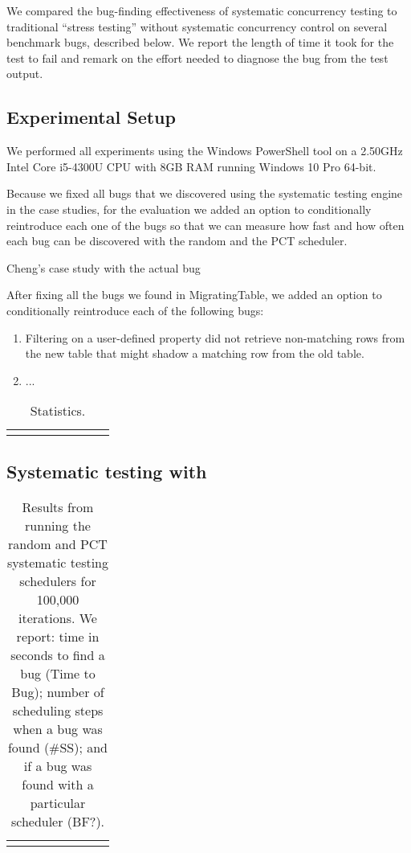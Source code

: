 We compared the bug-finding effectiveness of \psharp systematic concurrency testing to traditional ``stress testing'' without systematic concurrency control on several benchmark bugs, described below.  We report the length of time it took for the test to fail and remark on the effort needed to diagnose the bug from the test output. 

\subsection{Experimental Setup}

We performed all experiments using the Windows PowerShell tool on a 2.50GHz Intel Core i5-4300U CPU with 8GB RAM running Windows 10 Pro 64-bit.

Because we fixed all bugs that we discovered using the \psharp systematic testing engine in the case studies, for the evaluation we added an option to conditionally reintroduce each one of the bugs so that we can measure how fast and how often each bug can be discovered with the \psharp random and the PCT scheduler.

Cheng's case study with the actual bug

After fixing all the bugs we found in MigratingTable, we added an option to conditionally reintroduce each of the following bugs:
\begin{enumerate}
\item Filtering on a user-defined property did not retrieve non-matching rows from the new table that might shadow a matching row from the old table.
\item ...
\end{enumerate}

\newcommand{\colspacing}{\hspace{1.8em}}
\begin{table}[t]
\small
\centering
\setlength{\tabcolsep}{0.3em}
\label{tab:stats}
\begin{tabular}{l rrrrr rr}
\centering

\end{tabular}
\caption{Statistics.}
\end{table}

\subsection{Systematic testing with \psharp}

\setlength{\tabcolsep}{.72em}
\begin{table*}[t]
\small
\centering
\begin{tabular}{rl rrr rrr}
\centering

\end{tabular}
\caption{Results from running the \psharp random and PCT systematic testing schedulers for 100,000 iterations. We report: time in seconds to find a bug (Time to Bug); number of scheduling steps when a bug was found (\#SS); and if a bug was found with a particular scheduler (BF?).}
\label{tab:testing}
\end{table*}

